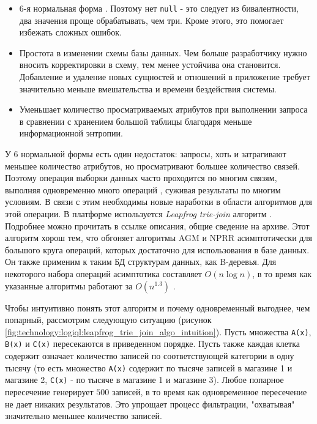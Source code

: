 \begin{itemize}
  \item 6-я нормальная форма \cite{intro_into_db}. Поэтому нет \lstinline{null} - это следует из бивалентности, два значения проще обрабатывать, чем три. Кроме этого, это помогает избежать сложных ошибок. \cite{three_valued_logic}
  \item Простота в изменении схемы базы данных. Чем больше разработчику нужно вносить корректировки в схему, тем менее устойчива она становится. Добавление и удаление новых сущностей и отношений в \logiql приложение требует значительно меньше вмешательства и времени бездействия системы.
  \item Уменьшает количество просматриваемых атрибутов при выполнении запроса в сравнении с хранением большой таблицы благодаря меньше информационной энтропии.
\end{itemize}

У 6 нормальной формы есть один недостаток: запросы, хоть и затрагивают меньшее количество атрибутов, но просматривают большее количество связей. Поэтому операция выборки данных часто проходится по многим связям, выполняя одновременно много операций \join, суживая результаты по многим условиям. В связи с этим необходимы новые наработки в области алгоритмов для этой операции. В платформе используется \emph{Leapfrog trie-join} алгоритм \cite{leapfrog_tree_join_algo}. Подробнее можно прочитать в ссылке описания, общие сведение на архиве. Этот алгоритм хорош тем, что обгоняет алгоритмы AGM и NPRR асимптотически для большого круга операций, которых достаточно для использования в базе данных. Он также применим к таким БД структурам данных, как B-деревья. Для некоторого набора операций асимптотика составляет $O(n\log{n})$, в то время как указанные алгоритмы работают за $O(n^{1.3})$ \cite{join_algorithms}.

Чтобы интуитивно понять этот алгоритм и почему одновременный \join выгоднее, чем попарный, рассмотрим следующую ситуацию (рисунок \ref{fig:technology:logiql:leapfrog_trie_join_algo_intuition}). Пусть множества \lstinline{A(x)}, \lstinline{B(x)} и  \lstinline{C(x)} пересекаются в приведенном порядке. Пусть также каждая клетка содержит означает количество записей по соответствующей категории в одну тысячу (то есть множество  \lstinline{A(x)} содержит по тысяче записей в магазине 1 и магазине 2, \lstinline{C(x)} - по тысяче в магазине 1 и магазине 3). Любое попарное пересечение генерирует $500$ записей, в то время как одновременное пересечение не дает никаких результатов. Это упрощает процесс фильтрации, "охватывая" значительно меньшее количество записей.

